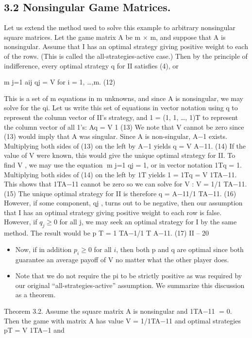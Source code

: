 \documentclass[]{report}
\begin{document}
\subsection{3.2 Nonsingular Game Matrices.} Let us extend the method used to solve this
example to arbitrary nonsingular square matrices. Let the game matrix A be m × m,
and suppose that A is nonsingular. Assume that I has an optimal strategy giving positive
weight to each of the rows. (This is called the all-strategies-active case.) Then by the
principle of indifference, every optimal strategy q for II satisfies (4), or

m
j=1
aij qj = V for i = 1, \ldots,m. (12)

This is a set of m equations in m unknowns, and since A is nonsingular, we may solve
for the qi. Let us write this set of equations in vector notation using q to represent the
column vector of II’s strategy, and 1 = (1, 1, \ldots, 1)T to represent the column vector of all
1’s:
Aq = V 1 (13)
We note that V cannot be zero since (13) would imply that A was singular. Since A is
non-singular, A−1 exists. Multiplying both sides of (13) on the left by A−1 yields
q = V A−11. (14)
If the value of V were known, this would give the unique optimal strategy for II. To find
V , we may use the equation m
j=1 qj = 1, or in vector notation 1Tq = 1. Multiplying both
sides of (14) on the left by 1T yields 1 = 1Tq = V 1TA−11. This shows that 1TA−11 cannot
be zero so we can solve for V :
V = 1/1
TA−11. (15)
The unique optimal strategy for II is therefore
q = A−11/1
TA−11. (16)
However, if some component, qj , turns out to be negative, then our assumption that I has
an optimal strategy giving positive weight to each row is false.
However, if $q_j \geq 0$ for all j, we may seek an optimal strategy for I by the same method.
The result would be
p
T = 1
TA−1/1
T
A−11. (17)
II – 20
\begin{itemize}
\item Now, if in addition $p_i \geq 0$ for all $i$, then both p and q are optimal since both guarantee an
average payoff of V no matter what the other player does.
\item Note that we do not require the
pi to be strictly positive as was required by our original “all-strategies-active” assumption.
We summarize this discussion as a theorem.
\end{itemize}
Theorem 3.2. Assume the square matrix A is nonsingular and 1TA−11 = 0. Then the
game with matrix A has value V = 1/1TA−11 and optimal strategies pT = V 1TA−1 and
\end{document}
